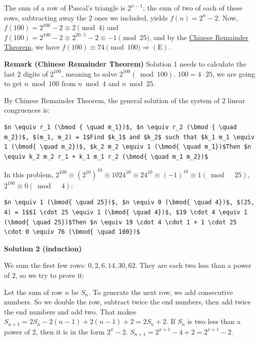 \begin{enumerate}
 The sum of a row of Pascal's triangle is $2^{n-1}$; the sum of two of each of these rows, subtracting away the $2$ ones we included, yields $f(n) = 2^n - 2$. Now, $f(100) = 2^{100} - 2 \equiv 2 \pmod{4}$ and $f(100) = 2^{100} - 2 \equiv 2^{20 \cdot 5} - 2 \equiv -1 \pmod{25}$, and by the \href{https://artofproblemsolving.com/wiki/index.php?title=Chinese\_Remainder\_Theorem}{Chinese Remainder Theorem}, we have $f(100) \equiv 74 \pmod{100} \Longrightarrow \mathrm{(E)}$.

 \textbf{Remark (Chinese Remainder Theorem)} Solution 1 needs to calculate the last $2$ digits of $2^{100}$, meaning to solve $2^{100} (\bmod{ 100})$. $100 = 4 \cdot 25$, we are going to get $n \bmod{ 100}$ from $n \bmod{ 4}$ and $n \bmod{ 25}$.

 By Chinese Remainder Theorem, the general solution of the system of $2$ linear congruences is:

 \begin{verbatim}
$n \equiv r_1 (\bmod { \quad m_1})$, $n \equiv r_2 (\bmod { \quad m_2})$, $(m_1, m_2) = 1$Find $k_1$ and $k_2$ such that $k_1 m_1 \equiv 1 (\bmod{ \quad m_2})$, $k_2 m_2 \equiv 1 (\bmod{ \quad m_1})$Then $n \equiv k_2 m_2 r_1 + k_1 m_1 r_2 (\bmod{ \quad m_1 m_2})$
\end{verbatim}

In this problem, $2^{100} \equiv (2^{10})^{10} \equiv 1024^{10} \equiv 24^{10} \equiv (-1)^{10} \equiv 1 (\bmod{ \quad 25})$, $2^{100} \equiv 0 (\bmod{ \quad 4})$:

 \begin{verbatim}
$n \equiv 1 (\bmod{ \quad 25})$, $n \equiv 0 (\bmod{ \quad 4})$, $(25, 4) = 1$$1 \cdot 25 \equiv 1 (\bmod{ \quad 4})$, $19 \cdot 4 \equiv 1 (\bmod{ \quad 25})$Then $n \equiv 19 \cdot 4 \cdot 1 + 1 \cdot 25 \cdot 0 \equiv 76 (\bmod{ \quad 100})$
\end{verbatim}





\textbf{Solution 2 (induction)}

We sum the first few rows: $0, 2, 6, 14, 30, 62$. They are each two less than a power of $2$, so we try to prove it:

 Let the sum of row $n$ be $S_n$. To generate the next row, we add consecutive numbers. So we double the row, subtract twice the end numbers, then add twice the end numbers and add two. That makes $S_{n+1}=2S_n-2(n-1)+2(n-1)+2=2S_n+2$. If $S_n$ is two less than a power of 2, then it is in the form $2^x-2$. $S_{n+1}=2^{x+1}-4+2=2^{x+1}-2$. 


\end{enumerate}
